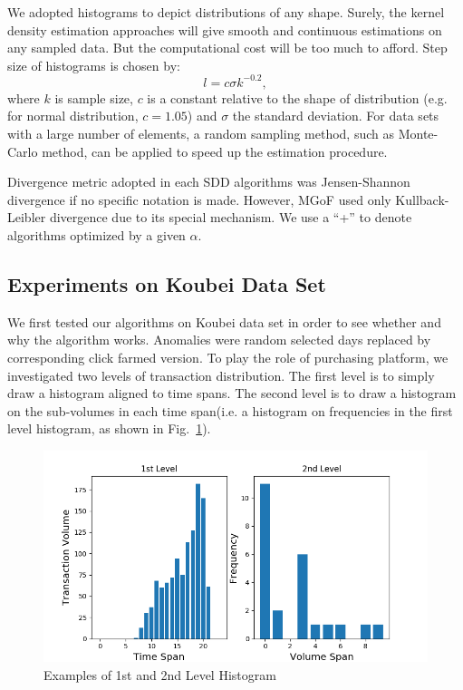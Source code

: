 \documentclass[10pt,conference,letterpaper]{article}
\begin{document}
			We adopted histograms to depict distributions of any shape. Surely, the kernel density estimation approaches will give smooth and continuous estimations on any sampled data. But the computational cost will be too much to afford. Step size of histograms is chosen by:
			\begin{equation}\label{equ:step-size}
				l = c \sigma k^{-0.2},
			\end{equation}
			where $k$ is sample size, $c$ is a constant relative to the shape of distribution (e.g. for normal distribution, $c=1.05$) and $\sigma$ the standard deviation. For data sets with a large number of elements, a random sampling method, such as Monte-Carlo method, can be applied to speed up the estimation procedure.
			
			Divergence metric adopted in each SDD algorithms was Jensen-Shannon divergence if no specific notation is made. However, MGoF used only Kullback-Leibler divergence due to its special mechanism. We use a ``+'' to denote algorithms optimized by a given $\alpha$.
			
		\subsection{Experiments on Koubei Data Set}\label{sec:exp-raw}
			We first tested our algorithms on Koubei data set in order to see whether and why the algorithm works. Anomalies were random selected days replaced by corresponding click farmed version. To play the role of purchasing platform, we investigated two levels of transaction distribution. The first level is to simply draw a histogram aligned to time spans. The second level is to draw a histogram on the sub-volumes in each time span(i.e. a histogram on frequencies in the first level histogram, as shown in Fig.~\ref{fig:histogram-example}).
			
			\begin{figure}[!t]
				\centering
				\includegraphics[width=\linewidth]{fig/HistogramExample.png}
				\caption{Examples of 1st and 2nd Level Histogram}
				\label{fig:histogram-example}
			\end{figure}
			
\end{document}
